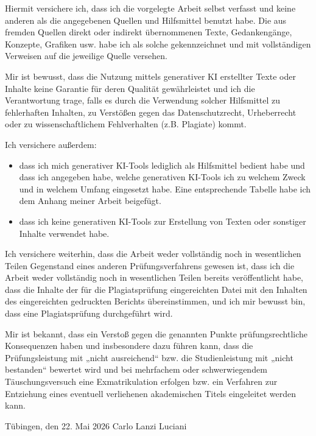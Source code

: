 Hiermit versichere ich, dass ich die vorgelegte Arbeit selbst verfasst und keine anderen
als die angegebenen Quellen und Hilfsmittel benutzt habe. Die aus fremden Quellen
direkt oder indirekt übernommenen Texte, Gedankengänge, Konzepte, Grafiken usw.
habe ich als solche gekennzeichnet und mit vollständigen Verweisen auf die jeweilige
Quelle versehen.

Mir ist bewusst, dass die Nutzung mittels generativer KI erstellter Texte oder Inhalte
keine Garantie für deren Qualität gewährleistet und ich die Verantwortung trage, falls
es durch die Verwendung solcher Hilfsmittel zu fehlerhaften Inhalten, zu Verstößen
gegen das Datenschutzrecht, Urheberrecht oder zu wissenschaftlichem Fehlverhalten
(z.B. Plagiate) kommt.

Ich versichere außerdem:

\begin{itemize}
	\item[$\mathrlap{\circ}\!\times$]
	dass ich mich generativer KI-Tools lediglich als Hilfsmittel bedient habe und
	dass ich angegeben habe, welche generativen KI-Tools ich zu welchem Zweck
	und in welchem Umfang eingesetzt habe. Eine entsprechende Tabelle habe ich
	dem Anhang meiner Arbeit beigefügt.
	\item[$\mathrlap{\circ}\!\times$]
	dass ich keine generativen KI-Tools zur Erstellung von Texten oder sonstiger
	Inhalte verwendet habe.
\end{itemize}

Ich versichere weiterhin, dass die Arbeit weder vollständig noch in wesentlichen Teilen
Gegenstand eines anderen Prüfungsverfahrens gewesen ist, dass ich die Arbeit weder
vollständig noch in wesentlichen Teilen bereits veröffentlicht habe, dass die Inhalte der
für die Plagiatsprüfung eingereichten Datei mit den Inhalten des eingereichten
gedruckten Berichts übereinstimmen, und ich mir bewusst bin, dass eine
Plagiatsprüfung durchgeführt wird.

Mir ist bekannt, dass ein Verstoß gegen die genannten Punkte prüfungsrechtliche
Konsequenzen haben und insbesondere dazu führen kann, dass die Prüfungsleistung
mit „nicht ausreichend“ bzw. die Studienleistung mit „nicht bestanden“ bewertet wird
und bei mehrfachem oder schwerwiegendem Täuschungsversuch eine
Exmatrikulation erfolgen bzw. ein Verfahren zur Entziehung eines eventuell
verliehenen akademischen Titels eingeleitet werden kann.

\vspace*{1cm}

\hspace*{1cm}Tübingen, den 22. Mai 2026
\hfill 
Carlo Lanzi Luciani\hspace*{1cm}

\vspace*{1cm}







